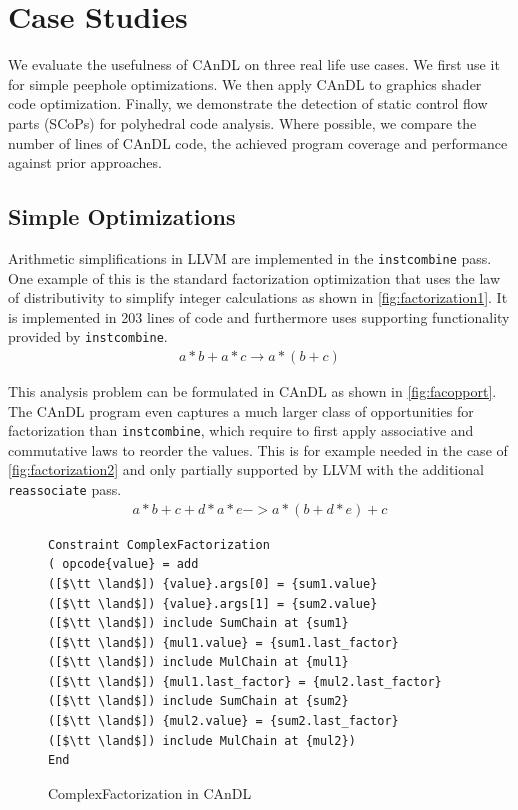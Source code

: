 \section{Case Studies}
\label{sec:casestudies}

    We evaluate the usefulness of CAnDL on three real life use cases.
    We first use it  for  simple peephole optimizations.
    We then apply CAnDL to graphics shader code optimization.
    Finally, we demonstrate the detection of static control flow parts (SCoPs)
    for polyhedral code analysis.
    Where possible, we compare the number of lines of CAnDL code, the achieved
    program coverage and performance against prior approaches.

\subsection{Simple Optimizations}

    Arithmetic simplifications in LLVM are implemented in the
    \texttt{instcombine} pass.
    One example of this is the standard factorization optimization that uses the
    law of distributivity to simplify integer calculations as shown in
    \autoref{fig:factorization1}.
    It is implemented in 203 lines of code and furthermore uses supporting
    functionality provided by \texttt{instcombine}.
    \begin{align}
        a*b+a*c\rightarrow a*(b+c)
        \label{fig:factorization1}
    \end{align}

    This analysis problem can be formulated in CAnDL as shown in
    \autoref{fig:facopport}.
    The CAnDL program even captures a much larger class of opportunities for
    factorization than \texttt{instcombine}, which require to first apply
    associative and commutative laws to reorder the values.
    This is for example needed in the case of \autoref{fig:factorization2} and
    only partially supported by LLVM with the additional \texttt{reassociate}
    pass.
    \begin{align}
        a*b+c+d*a*e->a*(b+d*e)+c
        \label{fig:factorization2}
    \end{align}

\begin{figure}[t]
\begin{lstlisting}[language=CAnDL]
Constraint ComplexFactorization
( opcode{value} = add
([$\tt \land$]) {value}.args[0] = {sum1.value}
([$\tt \land$]) {value}.args[1] = {sum2.value}
([$\tt \land$]) include SumChain at {sum1}
([$\tt \land$]) {mul1.value} = {sum1.last_factor}
([$\tt \land$]) include MulChain at {mul1}
([$\tt \land$]) {mul1.last_factor} = {mul2.last_factor}
([$\tt \land$]) include SumChain at {sum2}
([$\tt \land$]) {mul2.value} = {sum2.last_factor}
([$\tt \land$]) include MulChain at {mul2})
End
\end{lstlisting}
\vspace{-0.3cm}
\caption{ComplexFactorization in CAnDL}
\label{fig:facopport}
\end{figure}

